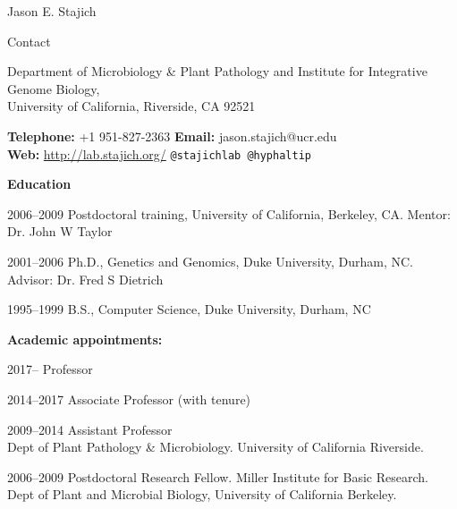 \documentclass[10pt]{article}
\begin{document}
\begin{cv}{\centerline{Jason E. Stajich}}


\setlength{\cvlabelwidth}{18mm}
\begin{cvlistcompact}{Contact}
\item{Department of Microbiology \& Plant Pathology and Institute for
  Integrative Genome Biology, \\
  University of California, Riverside, CA 92521}
  \item{ \textbf{Telephone:} +1 951-827-2363 \textbf{Email:}
    jason.stajich@ucr.edu \\
    \textbf{Web:} \url{http://lab.stajich.org/} {\tt @stajichlab @hyphaltip}}
\end{cvlistcompact}

\begin{cvlistcompact}{\bf Education}
\item [2006--2009] Postdoctoral training, University of California, Berkeley, CA. Mentor: Dr. John W Taylor
\item [2001--2006] Ph.D., Genetics and Genomics, Duke University, Durham, NC. Advisor: Dr. Fred S Dietrich
\item [1995--1999] B.S., Computer Science, Duke University, Durham, NC
\end{cvlistcompact}

\begin{cvlistcompact}{\bf Academic appointments:}
\item [2017--] Professor
\item [2014--2017] Associate Professor (with tenure)
\item [2009--2014] Assistant Professor
  \\ Dept of Plant Pathology \& Microbiology. University of California Riverside.
\item [2006--2009] Postdoctoral Research Fellow. Miller Institute for Basic Research. \\
  Dept of Plant and Microbial Biology, University of California
  Berkeley. \\
\end{cvlistcompact}


\end{cv}
\end{document}
